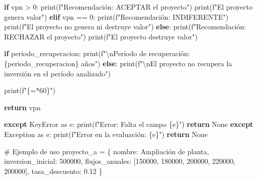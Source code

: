 \documentclass[
  doc,
  floatsintext,
  longtable,
  a4paper,
  nolmodern,
  notxfonts,
  notimes,
  12pt,
  colorlinks=true,linkcolor=blue,citecolor=blue,urlcolor=blue]{apa7}
\newenvironment{Shaded}{\begin{snugshade}}{\end{snugshade}}
\newcommand{\BuiltInTok}[1]{\textcolor[rgb]{0.00,0.23,0.31}{#1}}
\newcommand{\CharTok}[1]{\textcolor[rgb]{0.13,0.47,0.30}{#1}}
\newcommand{\CommentTok}[1]{\textcolor[rgb]{0.37,0.37,0.37}{#1}}
\newcommand{\ControlFlowTok}[1]{\textcolor[rgb]{0.00,0.23,0.31}{\textbf{#1}}}
\newcommand{\DecValTok}[1]{\textcolor[rgb]{0.68,0.00,0.00}{#1}}
\newcommand{\FloatTok}[1]{\textcolor[rgb]{0.68,0.00,0.00}{#1}}
\newcommand{\ImportTok}[1]{\textcolor[rgb]{0.00,0.46,0.62}{#1}}
\newcommand{\NormalTok}[1]{\textcolor[rgb]{0.00,0.23,0.31}{#1}}
\newcommand{\OperatorTok}[1]{\textcolor[rgb]{0.37,0.37,0.37}{#1}}
\newcommand{\PreprocessorTok}[1]{\textcolor[rgb]{0.68,0.00,0.00}{#1}}
\newcommand{\SpecialCharTok}[1]{\textcolor[rgb]{0.37,0.37,0.37}{#1}}
\newcommand{\SpecialStringTok}[1]{\textcolor[rgb]{0.13,0.47,0.30}{#1}}
\newcommand{\StringTok}[1]{\textcolor[rgb]{0.13,0.47,0.30}{#1}}
\newcommand{\VariableTok}[1]{\textcolor[rgb]{0.07,0.07,0.07}{#1}}
\begin{document}
\begin{Shaded}
\begin{Highlighting}[]
        \ControlFlowTok{if}\NormalTok{ vpn }\OperatorTok{\textgreater{}} \DecValTok{0}\NormalTok{:}
            \BuiltInTok{print}\NormalTok{(}\SpecialStringTok{f"Recomendación: ACEPTAR el proyecto"}\NormalTok{)}
            \BuiltInTok{print}\NormalTok{(}\SpecialStringTok{f"El proyecto genera valor"}\NormalTok{)}
        \ControlFlowTok{elif}\NormalTok{ vpn }\OperatorTok{==} \DecValTok{0}\NormalTok{:}
            \BuiltInTok{print}\NormalTok{(}\SpecialStringTok{f"Recomendación: INDIFERENTE"}\NormalTok{)}
            \BuiltInTok{print}\NormalTok{(}\SpecialStringTok{f"El proyecto no genera ni destruye valor"}\NormalTok{)}
        \ControlFlowTok{else}\NormalTok{:}
            \BuiltInTok{print}\NormalTok{(}\SpecialStringTok{f"Recomendación: RECHAZAR el proyecto"}\NormalTok{)}
            \BuiltInTok{print}\NormalTok{(}\SpecialStringTok{f"El proyecto destruye valor"}\NormalTok{)}
        
        \ControlFlowTok{if}\NormalTok{ periodo\_recuperacion:}
            \BuiltInTok{print}\NormalTok{(}\SpecialStringTok{f"}\CharTok{\textbackslash{}n}\SpecialStringTok{Período de recuperación: }\SpecialCharTok{\{}\NormalTok{periodo\_recuperacion}\SpecialCharTok{\}}\SpecialStringTok{ años"}\NormalTok{)}
        \ControlFlowTok{else}\NormalTok{:}
            \BuiltInTok{print}\NormalTok{(}\SpecialStringTok{f"}\CharTok{\textbackslash{}n}\SpecialStringTok{El proyecto no recupera la inversión en el período analizado"}\NormalTok{)}
        
        \BuiltInTok{print}\NormalTok{(}\SpecialStringTok{f"}\SpecialCharTok{\{}\StringTok{\textquotesingle{}=\textquotesingle{}}\OperatorTok{*}\DecValTok{60}\SpecialCharTok{\}}\SpecialStringTok{"}\NormalTok{)}
        
        \ControlFlowTok{return}\NormalTok{ vpn}
        
    \ControlFlowTok{except} \PreprocessorTok{KeyError} \ImportTok{as}\NormalTok{ e:}
        \BuiltInTok{print}\NormalTok{(}\SpecialStringTok{f"Error: Falta el campo }\SpecialCharTok{\{}\NormalTok{e}\SpecialCharTok{\}}\SpecialStringTok{"}\NormalTok{)}
        \ControlFlowTok{return} \VariableTok{None}
    \ControlFlowTok{except} \PreprocessorTok{Exception} \ImportTok{as}\NormalTok{ e:}
        \BuiltInTok{print}\NormalTok{(}\SpecialStringTok{f"Error en la evaluación: }\SpecialCharTok{\{}\NormalTok{e}\SpecialCharTok{\}}\SpecialStringTok{"}\NormalTok{)}
        \ControlFlowTok{return} \VariableTok{None}

\CommentTok{\# Ejemplo de uso}
\NormalTok{proyecto\_a }\OperatorTok{=}\NormalTok{ \{}
    \StringTok{\textquotesingle{}nombre\textquotesingle{}}\NormalTok{: }\StringTok{\textquotesingle{}Ampliación de planta\textquotesingle{}}\NormalTok{,}
    \StringTok{\textquotesingle{}inversion\_inicial\textquotesingle{}}\NormalTok{: }\DecValTok{500000}\NormalTok{,}
    \StringTok{\textquotesingle{}flujos\_anuales\textquotesingle{}}\NormalTok{: [}\DecValTok{150000}\NormalTok{, }\DecValTok{180000}\NormalTok{, }\DecValTok{200000}\NormalTok{, }\DecValTok{220000}\NormalTok{, }\DecValTok{200000}\NormalTok{],}
    \StringTok{\textquotesingle{}tasa\_descuento\textquotesingle{}}\NormalTok{: }\FloatTok{0.12}
\NormalTok{\}}


\end{Highlighting}
\end{Shaded}
\end{document}
